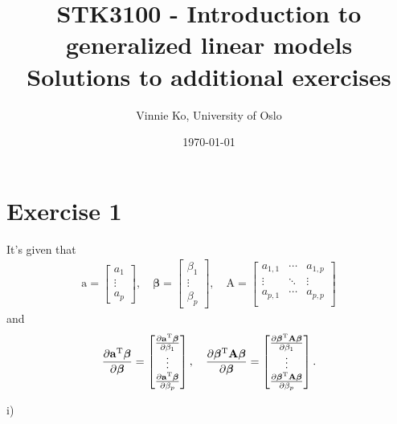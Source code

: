 \documentclass[a4paper]{article}
\title{STK3100 - Introduction to generalized linear models \\
Solutions to additional exercises}
\author{Vinnie Ko, University of Oslo}
\date{\today}
\begin{document}
\everymath{\displaystyle}
\maketitle

\section{Exercise 1}
It's given that
\begin{align*}
\bm{\mathrm{a}} = 
\begin{bmatrix}
a_1\\
\vdots\\
a_p
\end{bmatrix}
, \quad
\bm{\beta} = 
\begin{bmatrix}
\beta_1\\
\vdots\\
\beta_p
\end{bmatrix}
, \quad
\bm{\mathrm{A}} =
\begin{bmatrix}
a_{1,1} & \cdots & a_{1,p} \\
\vdots & \ddots & \vdots \\
a_{p,1} & \cdots & a_{p,p} \\
\end{bmatrix}
\end{align*}
and
\begin{align*}
\frac{\partial \bm{\mathrm{a}}^{\rm T}\bm{\beta}}{\partial \bm{\beta}}
=
\begin{bmatrix}
\frac{\partial \bm{\mathrm{a}}^{\rm T}\bm{\beta}}{\partial \beta_{1}}\\
\vdots\\
\frac{\partial \bm{\mathrm{a}}^{\rm T}\bm{\beta}}{\partial \beta_{p}}\\
\end{bmatrix}
, \quad
\frac{\partial \bm{\beta}^{\rm T}\bm{\mathrm{A}}\bm{\beta}}{\partial \bm{\beta}}
=
\begin{bmatrix}
\frac{\partial \bm{\beta}^{\rm T}\bm{\mathrm{A}}\bm{\beta}}{\partial \beta_{1}}\\
\vdots\\
\frac{\partial \bm{\beta}^{\rm T}\bm{\mathrm{A}}\bm{\beta}}{\partial \beta_{p}}\\
\end{bmatrix}
.
\end{align*}


i)\\
\end{document}
